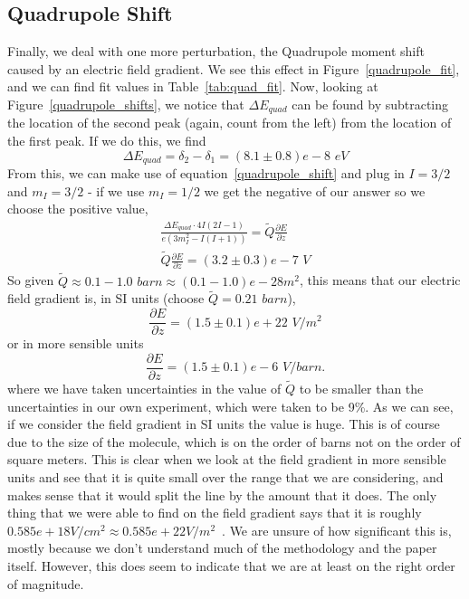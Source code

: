 \documentclass[reprint, nobibnotes, amssymb, amsmath, amsfonts, mathtools, mathrsfs, floatfix]{revtex4-1}
\begin{document}
    \subsection{Quadrupole Shift}
      Finally, we deal with one more perturbation, the Quadrupole moment shift caused by an electric field gradient.  We see this effect in Figure~\ref{quadrupole_fit}, and we can find fit values in Table~\ref{tab:quad_fit}.  Now, looking at Figure~\ref{quadrupole_shifts}, we notice that $\Delta E_{quad}$ can be found by subtracting the location of the second peak (again, count from the left) from the location of the first peak.  If we do this, we find
      \begin{equation}
        \Delta E_{quad} = \delta_2 - \delta_1 = (8.1 \pm 0.8)e-8 \,\, eV
      \end{equation}
      From this, we can make use of equation~\ref{quadrupole_shift} and plug in $I = 3/2$ and $m_I = 3/2$ - if we use $m_I = 1/2$ we get the negative of our answer so we choose the positive value,
      \begin{gather}
        \frac{\Delta E_{quad} \cdot 4I(2I-1)}{e\left(3 m_I^2 - I(I+1)\right)} = \tilde{Q}\frac{\partial E}{\partial z} \\
        \tilde{Q}\frac{\partial E}{\partial z} = (3.2\pm0.3)e-7 \,\, V
      \end{gather}
      So given $\tilde{Q} \approx 0.1-1.0 \,\, barn \approx (0.1-1.0)e-28 m^{2}$, this means that our electric field gradient is, in SI units (choose $\tilde{Q} = 0.21\,\, barn$\cite{field_gradient}),
      \begin{equation}
        \frac{\partial E}{\partial z} = (1.5\pm0.1)e+22 \,\, V/m^2
      \end{equation}
      or in more sensible units
      \begin{equation}
        \frac{\partial E}{\partial z} = (1.5\pm0.1)e-6\,\, V/barn.
      \end{equation}
      where we have taken uncertainties in the value of $\tilde{Q}$ to be smaller than the uncertainties in our own experiment, which were taken to be 9\%.  As we can see, if we consider the field gradient in SI units the value is huge.  This is of course due to the size of the molecule, which is on the order of barns not on the order of square meters.  This is clear when we look at the field gradient in more sensible units and see that it is quite small over the range that we are considering, and makes sense that it would split the line by the amount that it does.  The only thing that we were able to find on the field gradient says that it is roughly $0.585e+18 V/cm^2 \approx 0.585e+22 V/m^2$~\cite{na_nitroprusside}.  We are unsure of how significant this is, mostly because we don't understand much of the methodology and the paper itself.  However, this does seem to indicate that we are at least on the right order of magnitude.
\end{document}
